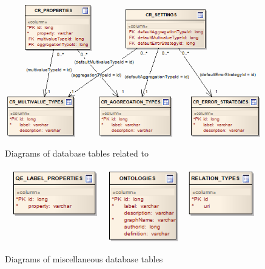 \begin{figure}[htbp]
    \centering
    \includegraphics[scale=0.6]{images/db-cr.png}
    \caption{Diagrams of database tables related to \CR}
	\label{fig:dbCR}
\end{figure}

\begin{figure}[htbp]
    \centering
    \includegraphics[scale=0.6]{images/db-misc.png}
    \caption{Diagrams of miscellaneous database tables}
	\label{fig:dbMisc}
\end{figure}




